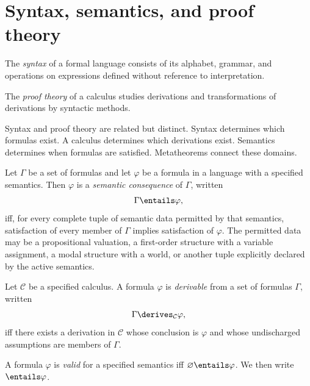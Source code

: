 \section{Syntax, semantics, and proof theory}
\label{sec:levels-03}

\begin{definition}[Syntax]
The \emph{syntax} of a formal language consists of its alphabet, grammar, and
operations on expressions defined without reference to interpretation.
\end{definition}

\begin{definition}
The \emph{proof theory} of a calculus studies derivations and transformations
of derivations by syntactic methods.
\end{definition}

Syntax and proof theory are related but distinct.  Syntax determines which
formulas exist.  A calculus determines which derivations exist.  Semantics
determines when formulas are satisfied.  Metatheorems connect these domains.

\begin{definition}
Let \(\Gamma\) be a set of formulas and let \(\varphi\) be a formula in a
language with a specified semantics.  Then \(\varphi\) is a \emph{semantic
consequence} of \(\Gamma\), written
\[
  \Gamma\entails\varphi,
\]
iff, for every complete tuple of semantic data permitted by that semantics,
satisfaction of every member of \(\Gamma\) implies satisfaction of
\(\varphi\).  The permitted data may be a propositional valuation, a
first-order structure with a variable assignment, a modal structure with a
world, or another tuple explicitly declared by the active semantics.
\end{definition}

\begin{definition}[Derivability]
Let \(\mathcal C\) be a specified calculus.  A formula \(\varphi\) is
\emph{derivable} from a set of formulas \(\Gamma\), written
\[
  \Gamma\derives_{\mathcal C}\varphi,
\]
iff there exists a derivation in \(\mathcal C\) whose conclusion is
\(\varphi\) and whose undischarged assumptions are members of \(\Gamma\).
\end{definition}

\begin{definition}[Validity]
A formula \(\varphi\) is \emph{valid} for a specified semantics iff
\(\varnothing\entails\varphi\).  We then write \(\entails\varphi\).
\end{definition}


